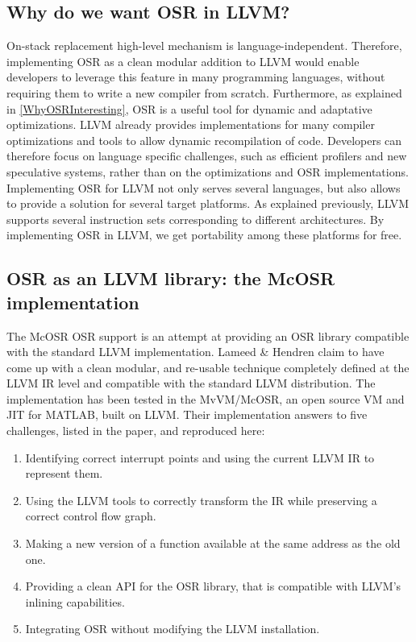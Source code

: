 \subsection{Why do we want OSR in LLVM?}

On-stack replacement high-level mechanism is language-independent.
Therefore, implementing OSR as a clean modular addition to LLVM would enable developers to leverage this feature in many programming languages, without requiring them to write a new compiler from scratch.
Furthermore, as explained in \ref{WhyOSRInteresting}, OSR is a useful tool for dynamic and adaptative optimizations.
LLVM already provides implementations for many compiler optimizations\cite{llvmUrl} and tools to allow dynamic recompilation of code.
Developers can therefore focus on language specific challenges, such as efficient profilers and new speculative systems, rather than on the optimizations and OSR implementations.\\

Implementing OSR for LLVM not only serves several languages, but also allows to provide a solution for several target platforms.
As explained previously, LLVM supports several instruction sets corresponding to different architectures.
By implementing OSR in LLVM, we get portability among these platforms for free.\\

\subsection{OSR as an LLVM library: the McOSR implementation}\label{McOSR}
The McOSR OSR support\cite{lameed2013modular} is an attempt at providing an OSR library compatible with the standard LLVM implementation. 
Lameed \& Hendren claim to have come up with a clean modular, and re-usable technique completely defined at the LLVM IR level and compatible with the standard LLVM distribution.
The implementation has been tested in the MvVM/McOSR\cite{chevalier2010optimizing, McVM}, an open source VM and JIT for MATLAB, built on LLVM.
Their implementation answers to five challenges, listed in the paper\cite{lameed2013modular}, and reproduced here:\\ 

\begin{enumerate}
    \item Identifying correct interrupt points and using the current LLVM IR to represent them.
    \item Using the LLVM tools to correctly transform the IR while preserving a correct control flow graph. 
    \item Making a new version of a function available at the same address as the old one.
    \item Providing a clean API for the OSR library, that is compatible with LLVM's inlining capabilities.
    \item Integrating OSR without modifying the LLVM installation.
\end{enumerate}

